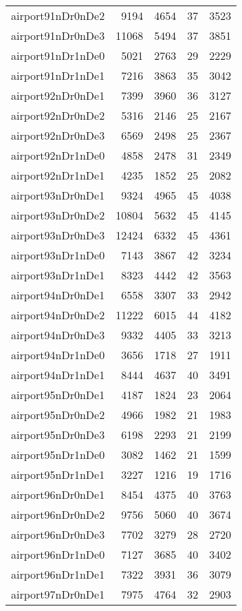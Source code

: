 \begin{longtable}{lrrrr}
airport91nDr0nDe2 & 9194 & 4654 & 37 & 3523 \\
airport91nDr0nDe3 & 11068 & 5494 & 37 & 3851 \\
airport91nDr1nDe0 & 5021 & 2763 & 29 & 2229 \\
airport91nDr1nDe1 & 7216 & 3863 & 35 & 3042 \\
airport92nDr0nDe1 & 7399 & 3960 & 36 & 3127 \\
airport92nDr0nDe2 & 5316 & 2146 & 25 & 2167 \\
airport92nDr0nDe3 & 6569 & 2498 & 25 & 2367 \\
airport92nDr1nDe0 & 4858 & 2478 & 31 & 2349 \\
airport92nDr1nDe1 & 4235 & 1852 & 25 & 2082 \\
airport93nDr0nDe1 & 9324 & 4965 & 45 & 4038 \\
airport93nDr0nDe2 & 10804 & 5632 & 45 & 4145 \\
airport93nDr0nDe3 & 12424 & 6332 & 45 & 4361 \\
airport93nDr1nDe0 & 7143 & 3867 & 42 & 3234 \\
airport93nDr1nDe1 & 8323 & 4442 & 42 & 3563 \\
airport94nDr0nDe1 & 6558 & 3307 & 33 & 2942 \\
airport94nDr0nDe2 & 11222 & 6015 & 44 & 4182 \\
airport94nDr0nDe3 & 9332 & 4405 & 33 & 3213 \\
airport94nDr1nDe0 & 3656 & 1718 & 27 & 1911 \\
airport94nDr1nDe1 & 8444 & 4637 & 40 & 3491 \\
airport95nDr0nDe1 & 4187 & 1824 & 23 & 2064 \\
airport95nDr0nDe2 & 4966 & 1982 & 21 & 1983 \\
airport95nDr0nDe3 & 6198 & 2293 & 21 & 2199 \\
airport95nDr1nDe0 & 3082 & 1462 & 21 & 1599 \\
airport95nDr1nDe1 & 3227 & 1216 & 19 & 1716 \\
airport96nDr0nDe1 & 8454 & 4375 & 40 & 3763 \\
airport96nDr0nDe2 & 9756 & 5060 & 40 & 3674 \\
airport96nDr0nDe3 & 7702 & 3279 & 28 & 2720 \\
airport96nDr1nDe0 & 7127 & 3685 & 40 & 3402 \\
airport96nDr1nDe1 & 7322 & 3931 & 36 & 3079 \\
airport97nDr0nDe1 & 7975 & 4764 & 32 & 2903 \\

\end{longtable}
